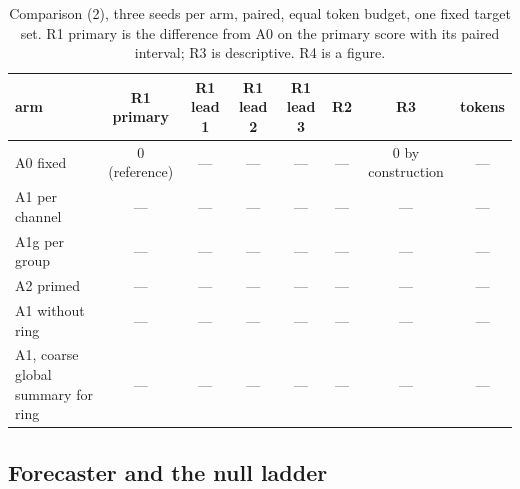 \documentclass[10pt]{article}
\newcommand{\tbd}{\textcolor{ink2}{---}}
\begin{document}
\begin{table}[H]
\centering\footnotesize
\begin{tabular}{@{}lccccccc@{}}
\toprule
arm & R1 primary & R1 lead 1 & R1 lead 2 & R1 lead 3 & R2 & R3 & tokens \\
\midrule
A0 fixed & 0 (reference) & \tbd & \tbd & \tbd & \tbd & 0 by construction & \tbd \\
A1 per channel & \tbd & \tbd & \tbd & \tbd & \tbd & \tbd & \tbd \\
A1g per group & \tbd & \tbd & \tbd & \tbd & \tbd & \tbd & \tbd \\
A2 primed & \tbd & \tbd & \tbd & \tbd & \tbd & \tbd & \tbd \\
A1 without ring & \tbd & \tbd & \tbd & \tbd & \tbd & \tbd & \tbd \\
A1, coarse global summary for ring & \tbd & \tbd & \tbd & \tbd & \tbd & \tbd & \tbd \\
\bottomrule
\end{tabular}
\caption{Comparison (2), three seeds per arm, paired, equal token budget,
one fixed target set. R1 primary is the difference from A0 on the primary
score with its paired interval; R3 is descriptive. R4 is a
figure.\label{tab:res-geometry}}
\end{table}

\subsection{Forecaster and the null ladder}
\end{document}
